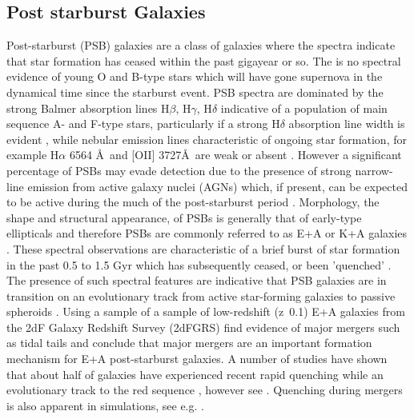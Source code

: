 \subsection{Post starburst Galaxies}
\label{post-starburst-galaxies}
Post-starburst (PSB) galaxies are a class of galaxies where the spectra indicate that star formation has ceased within the past gigayear or so. The is no spectral evidence of young O and B-type stars which will have gone supernova in the dynamical time since the starburst event. PSB spectra are dominated by the strong Balmer absorption lines H$\beta$, H$\gamma$, H$\delta$ indicative of a population of main sequence A- and F-type stars, particularly if a strong  H$\delta$ absorption line width is evident \citep{1997A&A...325.1025P}, while nebular emission lines characteristic of ongoing star formation, for example H$\alpha$ 6564 \AA\ and [OII] 3727\AA\, are weak or absent \citep{2001ApJ...547L..17B,2003PASJ...55..771G,2004MNRAS.355..713B,2005MNRAS.357..937G,2018MNRAS.477.1708P}. However a significant percentage of PSBs may evade detection due to the presence of strong narrow-line emission from active galaxy nuclei (AGNs) which, if present, can be expected to be active during the much of the post-starburst period \citep{2018MNRAS.477.1708P}. Morphology, the shape and structural appearance, of PSBs is generally that of early-type ellipticals and therefore PSBs are commonly referred to as E+A or K+A galaxies \citep{1983ApJ...270....7D,1996ApJ...466..104Z,2009ARA&A..47..159B}. These spectral observations are characteristic of a brief burst of star formation in the past 0.5 to 1.5 Gyr which has subsequently ceased, or been 'quenched' \citep{1983ApJ...270....7D,1987MNRAS.229..423C,1997A&A...325.1025P}. The presence of such spectral features are indicative that PSB galaxies are in transition on an evolutionary track from active star-forming galaxies to passive spheroids \citep{2004MNRAS.355..713B,2012MNRAS.420..672S,2013MNRAS.429.2212M}. Using a sample of a sample of low-redshift (z~0.1) E+A galaxies from the 2dF Galaxy Redshift Survey (2dFGRS) \citet{2004MNRAS.355..713B} find evidence of major mergers such as tidal tails and conclude that major mergers are an important formation mechanism for E+A post-starburst galaxies. A number of studies have shown that about half of galaxies have experienced recent rapid quenching while an evolutionary track to the red sequence \citep{Martin_2007,10.1111/j.1365-2966.2009.14537.x,2015MNRAS.450..435S}, however see \cite{2017ApJ...845..145W}. Quenching during mergers is also apparent in simulations, see e.g. \cite{2019MNRAS.484.2447D}.


